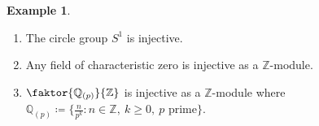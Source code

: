 \documentclass[10pt,letterpaper,cm]{nupset}
\theoremstyle{definition}
\newtheorem{exmp}{Example}
\newtheorem{corollary}{Corollary}
\newcommand{\Q}{\mathbb Q}
\newcommand{\Z}{\mathbb Z}
\newcommand{\1}{\mathbf{1}}
\newcommand{\0}{\vec 0}
\begin{document}
\begin{exmp}
\begin{enumerate}
\begin{proof}
We claim that $\tilde{\xi}$ is well-defined. If $\{n \in \Z : nx \in A\} = (0)$, then $\tilde{\xi}(x) =0$ and $\tilde{\xi}(\tilde{a}) = \xi(a)$, where $a$ is uniquely determined from $\tilde{a}$.  If $\{n \in \Z : nx \in A\} = (n_0)$, then $\tilde{\xi}(\tilde{a}) = \xi(a) + \frac{m\xi(n_0x)}{n_0}$. If $\tilde{a} = b + kx$, then $a-b = (k-m)x $. If this equals $0$, then we're done.
Otherwise, $k-m = dn_0$ for some integer $d\ne 0$.  Then 
\begin{align*} 
& 0 = \xi(a-b) - \xi((k-m)x) = \xi(a) - \xi(b) - \xi(dn_0x) 
\\ & =  \xi(a) - \xi(b) - \tilde{\xi}(dn_0x) =  \xi(a) - \xi(b) -dn_0 \tilde{\xi}(x)
\\ & =  \xi(a) - \xi(b) -(k-m) \tilde{\xi}(x) = \xi(a) - \xi(b) +\frac{m-k}{n_0}\xi(n_0x)
\\ & = \tilde{\xi}(a+mx) - \tilde{\xi}(b+kx).
\end{align*}
We have shown that $(\tilde{A}, \tilde{\xi}) > (A, \xi)$, a contradiction. 
\end{proof}
\begin{corollary}
Any divisible abelian group is injective.
\end{corollary}
\item The circle group $S^1$ is injective.
\item Any field of characteristic zero is injective as a $\Z$-module. 
\item $\faktor{\Q_{(p)}}{\Z}$ is injective as a $\Z$-module where $\Q_{(p)} \coloneqq  \{\frac{n}{p^k} : n \in \Z, \ k\geq 0,  \ p \text{ prime}  \}$.
\end{enumerate}
\end{exmp}
\end{document}
